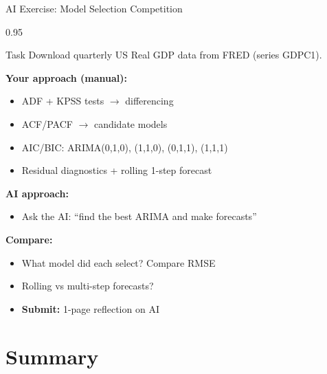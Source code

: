 \documentclass[9pt, aspectratio=169, t]{beamer}
\begin{document}
\begin{frame}{AI Exercise: Model Selection Competition}
    \begin{cminipage}{0.95\textwidth}
    \vspace{-0.4cm}
    \begin{block}{Task}
        Download quarterly US Real GDP data from FRED (series GDPC1).
    \end{block}

    \vspace{0.2cm}

    {\small
    \textbf{Your approach (manual):}
    \begin{itemize}\setlength{\itemsep}{0pt}
        \item ADF + KPSS tests $\to$ differencing
        \item ACF/PACF $\to$ candidate models
        \item AIC/BIC: ARIMA(0,1,0), (1,1,0), (0,1,1), (1,1,1)
        \item Residual diagnostics + rolling 1-step forecast
    \end{itemize}
    \vspace{0.1cm}
    \textbf{AI approach:}
    \begin{itemize}\setlength{\itemsep}{0pt}
        \item Ask the AI: ``find the best ARIMA and make forecasts''
    \end{itemize}
    \vspace{0.1cm}
    \textbf{Compare:}
    \begin{itemize}\setlength{\itemsep}{0pt}
        \item What model did each select? Compare RMSE
        \item Rolling vs multi-step forecasts?
        \item \textbf{Submit:} 1-page reflection on AI
    \end{itemize}
    }
    \end{cminipage}
\end{frame}

\section{Summary}
\end{document}
